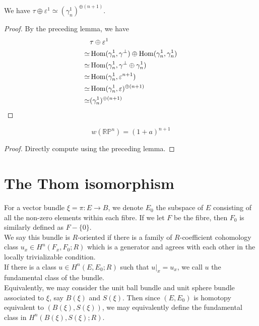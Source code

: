 	\begin{lemma}
		We have $\tau\oplus\varepsilon^1\simeq(\gamma_n^1)^{\oplus (n+1)}$. 
	\end{lemma}
	\begin{proof}
		By the preceding lemma, we have
		\begin{align*}
			&\tau\oplus\varepsilon^1\\
			\simeq&\operatorname{\mathrm{Hom}}(\gamma_n^1,\gamma^\bot)\oplus\operatorname{\mathrm{Hom}}(\gamma_n^1,\gamma_n^1)\\
			\simeq&\operatorname{\mathrm{Hom}}(\gamma_n^1,\gamma^\bot\oplus\gamma_n^1)\\
			\simeq&\operatorname{\mathrm{Hom}}(\gamma_n^1,\varepsilon^{n+1})\\
			\simeq&\operatorname{\mathrm{Hom}}(\gamma_n^1,\varepsilon)^{\oplus (n+1)}\\
			\simeq&(\gamma_n^1)^{\oplus (n+1)}
		\end{align*}
	\end{proof}

	\begin{coro}
		\[ w(\mathbb{RP}^n)=(1+a)^{n+1} \]
	\end{coro}
	\begin{proof}
		Directly compute using the preceding lemma. 
	\end{proof}

\section{The Thom isomorphism}

	\begin{defn}
		For a vector bundle $\xi=\pi:E\to B$, we denote $E_0$ the subspace of $E$ consisting of all the non-zero elements within each fibre. If we let $F$ be the fibre, then $F_0$ is similarly defined as $F-\{0\}$. \\
		We say this bundle is $R$-oriented if there is a family of $R$-coefficient cohomology class $u_x\in H^n(F_x,F_0;R)$ which is a generator and agrees with each other in the locally trivializable condition. \\
		If there is a class $u\in H^n(E,E_0;R)$ such that $u|_x=u_x$, we call $u$ the fundamental class of the bundle. \\
		Equivalently, we may consider the unit ball bundle and unit sphere bundle associated to $\xi$, say $B(\xi)$ and $S(\xi)$. Then since $(E,E_0)$ is homotopy equivalent to $(B(\xi),S(\xi))$, we may equivalently define the fundamental class in $H^n(B(\xi),S(\xi);R)$. 
	\end{defn}

